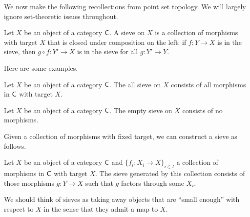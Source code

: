 We now make the following recollections from point set topology. We will largely ignore set-theoretic issues throughout. 
\begin{definition}[Sieve]\label{def: sieve}
    Let $X$ be an object of a category $\mathsf{C}$. A sieve on $X$ is a collection of morphisms with target $X$ that is closed under composition on the left: if $f:Y\to X$ is in the sieve, then $g\circ f:Y'\to X$ is in the sieve for all $g:Y'\to Y$. 
\end{definition}
Here are some examples.
\begin{definition}\label{def: all sieve}
    Let $X$ be an object of a category $\mathsf{C}$. The all sieve on $X$ consists of all morphisms in $\mathsf{C}$ with target $X$. 
\end{definition}
\begin{definition}\label{def: empty sieve}
    Let $X$ be an object of a category $\mathsf{C}$. The empty sieve on $X$ consists of no morphisms. 
\end{definition}
Given a collection of morphisms with fixed target, we can construct a sieve as follows. 
\begin{definition}\label{def: sieve generated by a collection}
    Let $X$ be an object of a category $\mathsf{C}$ and $\{f_{i}:X_{i}\to X\}_{i\in I}$ a collection of morphisms in $\mathsf{C}$ with target $X$. The sieve generated by this collection consists of those morphisms $g:Y\to X$ such that $g$ factors through some $X_{i}$.
\end{definition}
We should think of sieves as taking away objects that are ``small enough'' with respect to $X$ in the sense that they admit a map to $X$.  